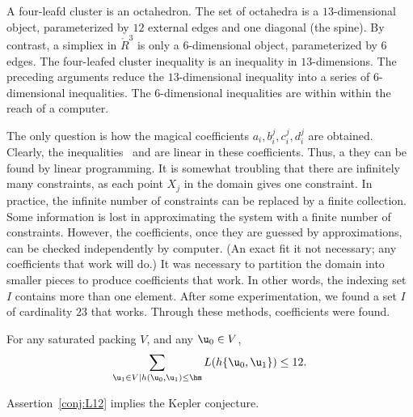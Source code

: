 {A four-leafd cluster is an octahedron.  The set of octahedra is a
$13$-dimensional object, parameterized by $12$ external edges and one
diagonal (the spine).  By contrast, a simpliex in $\ring{R}^3$ is only
a $6$-dimensional object, parameterized by $6$ edges.  The four-leafed
cluster inequality is an inequality in $13$-dimensions.  The preceding
arguments reduce the $13$-dimensional inequality into a series of
$6$-dimensional inequalities.  The $6$-dimensional inequalities are
within within the reach of a computer.

The only question is how the magical coefficients
$a_i,b_i^j,c_i^j,d_i^j$ are obtained.  Clearly, the
inequalities~ and  are linear in these
coefficients.  Thus, a they can be found by linear programming.  It is
somewhat troubling that there are infinitely many constraints, as each
point $X_j$ in the domain gives one constraint.  In practice, the
infinite number of constraints can be replaced by a finite collection.
Some information is lost in approximating the system with a finite
number of constraints.  However, the coefficients, once they are
guessed by approximations, can be checked independently by computer.
(An exact fit it not necessary; any coefficients that work will do.)
It was necessary to partition the domain into smaller pieces to
produce coefficients that work.  In other words, the indexing set $I$
contains more than one element.  After some experimentation, we found
a set $I$ of cardinality $23$ that works.  Through these methods,
coefficients were found.
} %

\begin{assertion}\label{conj:L12} 
  For any  saturated packing $ V$, and any $ \u_0\in V$,
\begin{equation}\label{eqn:L12} 
\sum_{ \u_1\in V\mid h( \u_0, \u_1)\le \hm} L(h\{\u_0, \u_1\}) \le 12.
\end{equation}
\end{assertion}

\begin{lemma}[]\label{theorem:mk2} 
Assertion~\ref{conj:L12} implies the Kepler conjecture.
\end{lemma}

